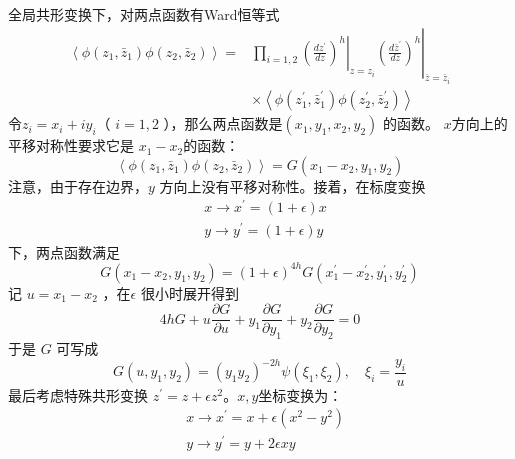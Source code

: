 全局共形变换下，对两点函数有Ward恒等式
\begin{equation}
	\begin{aligned} \left\langle\phi\left(z_{1}, \bar{z}_{1}\right) \phi\left(z_{2}, \bar{z}_{2}\right)\right\rangle=&\left.\left.\prod_{i=1,2}\left(\frac{d z^{\prime}}{d z}\right)^{h}\right|_{z=z_{i}}\left(\frac{d \bar{z}^{\prime}}{d \bar{z}}\right)^{h}\right|_{\bar{z}=\bar{z}_{i}} \\ & \times\left\langle\phi\left(z_{1}^{\prime}, \bar{z}_{1}^{\prime}\right) \phi\left(z_{2}^{\prime}, \bar{z}_{2}^{\prime}\right)\right\rangle \end{aligned} 
\end{equation}
令$ z_{i}=x_{i}+i y_{i} $（ $i=1,2$ ），那么两点函数是$ \left(x_{1}, y_{1}, x_{2}, y_{2}\right)$ 的函数。 $x $方向上的平移对称性要求它是 $x_1-x_2 $的函数：
$$
\left\langle\phi\left(z_{1}, \bar{z}_{1}\right) \phi\left(z_{2}, \bar{z}_{2}\right)\right\rangle=G\left(x_{1}-x_{2}, y_{1}, y_{2}\right)
$$
注意，由于存在边界，$ y$ 方向上没有平移对称性。接着，在标度变换
\begin{equation}
	\begin{aligned} &x \rightarrow x^{\prime}=(1+\epsilon) x \\ &y \rightarrow y^{\prime}=(1+\epsilon) y \end{aligned} 
\end{equation}
下，两点函数满足
\begin{equation}
	G\left(x_{1}-x_{2}, y_{1}, y_{2}\right)=(1+\epsilon)^{4 h} G\left(x_{1}^{\prime}-x_{2}^{\prime}, y_{1}^{\prime}, y_{2}^{\prime}\right) 
\end{equation}
记 $u=x_{1}-x_{2}$ ，在$ \epsilon$ 很小时展开得到
\begin{equation}	
4 h G+u \frac{\partial G}{\partial u}+y_{1} \frac{\partial G}{\partial y_{1}}+y_{2} \frac{\partial G}{\partial y_{2}}=0 
\end{equation}
于是 $G$ 可写成
\begin{equation}
	G\left(u, y_{1}, y_{2}\right)=\left(y_{1} y_{2}\right)^{-2 h} \psi\left(\xi_{1}, \xi_{2}\right), \quad \xi_{i}=\frac{y_{i}}{u}
\end{equation} 
最后考虑特殊共形变换 $z^{\prime}=z+\epsilon z^{2} $。$ x,y $坐标变换为：
\begin{equation}
	\begin{aligned} &x \rightarrow x^{\prime}=x+\epsilon\left(x^{2}-y^{2}\right)\\ &y \rightarrow y^{\prime}=y+2 \epsilon x y \end{aligned} 
\end{equation}
